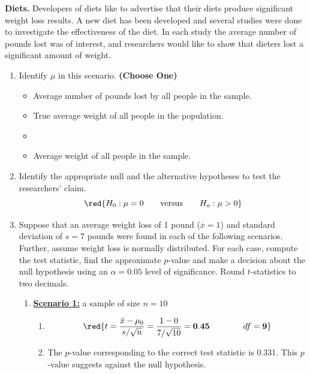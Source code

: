 \item \textbf{Diets.}  Developers of diets like to advertise that their diets produce significant weight loss results.  A new diet has been developed and several studies were done to investigate the effectiveness of the diet. In each study the average number of pounds lost was of interest, and researchers would like to show that dieters lost a significant amount of weight.
\begin{enumerate}
\item  Identify $\mu$ in this scenario. \textbf{(Choose One)}
\begin{itemize}
	\item Average number of pounds lost by all people in the sample.
	\item True average weight of all people in the population.
	\item {}
	\item Average weight of all people in the sample.
\end{itemize}
\item   Identify the appropriate null and the alternative hypotheses to test the researchers' claim.
$$\red{H_0: \mu = 0 \qquad \mbox{versus}  \qquad  H_a: \mu > 0}$$
\item  Suppose that an average weight loss of 1 pound (${\overline x} = 1$) and standard deviation of $s = 7$ pounds were found in each of the following scenarios. Further, assume weight loss is normally distributed. For each case, compute the test statistic, find the approximate $p$-value and make a decision about the null hypothesis using an $\alpha = 0.05$ level of significance. Round $t$-statistics to two decimals.
\begin{enumerate}
\item  \textbf{\underline{Scenario 1:}} a sample of size $n = 10$\\
\begin{enumerate}
\item  $$\red{t = \frac{\bar{x} - \mu_0}{s/\sqrt{n}} = \frac{1 - 0}{7/\sqrt{10}} = \mathbf{0.45} \qquad \qquad df = \mathbf{9}
}$$

\item The $p$-value corresponding to the correct test statistic is 0.331. This $p$-value suggests \underline{} against the null hypothesis. 


\end{enumerate}
\end{enumerate}
\end{enumerate}
